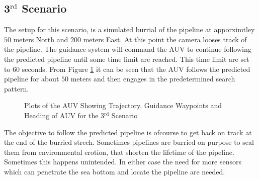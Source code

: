 	\subsection{3$^{\mathrm{rd}}$ Scenario}
		The setup for this scenario, is a simulated burrial of the pipeline at apporximtley $50$
		meters North and $200$ meters East. At this point the camera looses track of the pipeline. The
		guidance system will command the AUV to continue following the predicted pipeline until some
		time limit are reached. This time limit are set to $60$ seconds. From Figure
		\ref{fig:ch3_3rd_NE_plots} it can be seen that the AUV follows the predicted pipeline for
		about $50$ meters and then engages in the predetermined search pattern.
		\begin{figure}[htbp]
			\centering
			\caption{Plots of the AUV Showing Trajectory, Guidance Waypoints and Heading of AUV
			for the 3$^{\mathrm{rd}}$ Scenario}
			\label{fig:ch3_3rd_NE_plots}
		\end{figure}
		
		The objective to follow the predicted pipeline is ofcourse to get back on track at the end of
		the burried strech. Sometimes pipelines are burried on purpose to seal them from environmental
		erotion, that shorten the lifetime of the pipeline. Sometimes this happens unintended. In
		either case the need for more sensors which can penetrate the sea bottom and locate the
		pipeline are needed. 
		
